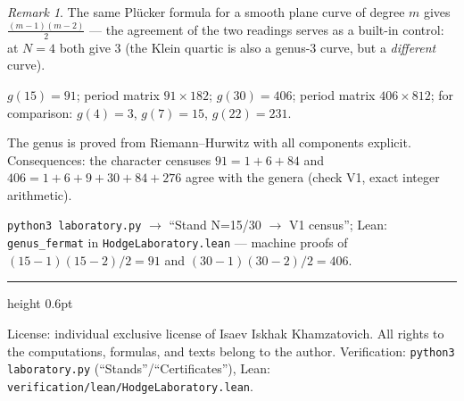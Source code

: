 \documentclass[11pt,a4paper]{article}
\theoremstyle{plain}
\theoremstyle{definition}
\theoremstyle{remark}
\newtheorem{remark}[theorem]{Remark}
\begin{document}
\begin{remark}
The same Pl\"ucker formula for a smooth plane curve of degree $m$
gives $\tfrac{(m-1)(m-2)}2$ --- the agreement of the two readings
serves as a built-in control: at $N=4$ both give $3$ (the Klein
quartic is also a genus-3 curve, but a \emph{different} curve).
\end{remark}

\begin{databox}[numbers]
$g(15)=91$; period matrix $91\times182$; $g(30)=406$; period matrix
$406\times812$; for comparison: $g(4)=3$, $g(7)=15$, $g(22)=231$.
\end{databox}

\begin{statusbox}[summary]
The genus is proved from Riemann--Hurwitz with all components
explicit. Consequences: the character censuses $91=1+6+84$ and
$406=1+6+9+30+84+276$ agree with the genera (check V1, exact
integer arithmetic).
\end{statusbox}

\begin{verifybox}[reproduction]
\texttt{python3 laboratory.py} $\to$ ``Stand N=15/30 $\to$ V1
census''; Lean: \texttt{genus\_fermat} in
\texttt{HodgeLaboratory.lean} --- machine proofs of
$(15-1)(15-2)/2=91$ and $(30-1)(30-2)/2=406$.
\end{verifybox}

\vfill
{\color{linkblue}\hrule height 0.6pt}
\vspace{0.5em}
{\small\color{gray}
License: individual exclusive license of Isaev Iskhak Khamzatovich.
All rights to the computations, formulas, and texts belong to the author.
Verification: \texttt{python3 laboratory.py} (``Stands''/``Certificates''),
Lean: \texttt{verification/lean/HodgeLaboratory.lean}.
}
\end{document}
